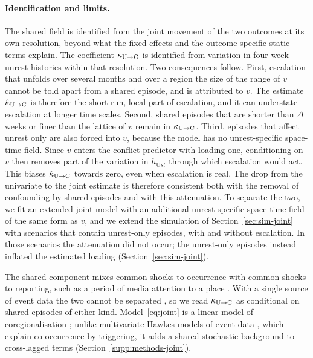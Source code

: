 \paragraph{Identification and limits.} The shared field is identified from the joint
movement of the two outcomes at its own resolution, beyond what the fixed effects
and the outcome-specific static terms explain. The coefficient $\kappa_{\mathrm{U}\to\mathrm{C}}$ is identified
from variation in four-week unrest histories within that resolution. Two consequences
follow. First, escalation that unfolds over several months and over a region the size
of the range of $v$ cannot be told apart from a shared episode, and is attributed to
$v$. The estimate $\hat\kappa_{\mathrm{U}\to\mathrm{C}}$ is therefore the short-run, local part of escalation,
and it can understate escalation at longer time scales. Second, shared episodes that
are shorter than $\Delta$ weeks or finer than the lattice of $v$ remain in $\kappa_{\mathrm{U}\to\mathrm{C}}$.
Third, episodes that affect unrest only are also forced into $v$, because the model has
no unrest-specific space-time field. Since $v$ enters the conflict predictor with
loading one, conditioning on $v$ then removes part of the variation in
$h_{\mathrm{U}st}$ through which escalation would act. This biases $\hat\kappa_{\mathrm{U}\to\mathrm{C}}$ towards
zero, even when escalation is real. The drop from the univariate to the joint estimate
is therefore consistent both with the removal of confounding by shared episodes and
with this attenuation. To separate the two, we fit an extended joint model with an
additional unrest-specific space-time field of the same form as $v$, and we extend the
simulation of Section~\ref{sec:sim-joint} with scenarios that contain unrest-only
episodes, with and without escalation. In those scenarios the attenuation did not
occur; the unrest-only episodes instead inflated the estimated loading
(Section~\ref{sec:sim-joint}).

The shared component mixes common shocks to occurrence with common shocks to
reporting, such as a period of media attention to a place
\citep{weidmann2016closer, hellmeier2018spotlight}. With a single source of event data
the two cannot be separated \citep{cook2017twowrongs}, so we read $\kappa_{\mathrm{U}\to\mathrm{C}}$ as
conditional on shared episodes of either kind. Model~\eqref{eq:joint} is a linear model
of coregionalisation \citep{gelfand2004nonstationary}; unlike multivariate Hawkes models
of event data \citep{jun2024hawkes, browning2026hawkes}, which explain co-occurrence by
triggering, it adds a shared stochastic background to cross-lagged terms
(Section~\ref{supp:methods-joint}).

